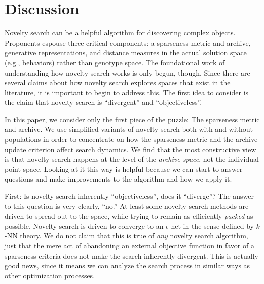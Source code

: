\documentclass[twoside]{article}
\begin{document}
\section{Discussion}
\label{sec:discussion}


Novelty search can be a helpful algorithm for discovering complex objects.  Proponents espouse three critical components:  a sparseness metric and archive, generative representations, and distance measures in the actual solution space (e.g., behaviors) rather than genotype space.  The foundational work of understanding how novelty search works is only begun, though.  Since there are several claims about how novelty search explores spaces that exist in the literature, it is important to begin to address this.  The first idea to consider is the claim that novelty search is ``divergent'' and ``objectiveless''.  

In this paper, we consider only the first piece of the puzzle:  The sparseness metric and archive.  We use simplified variants of novelty search both with and without populations in order to concentrate on how the sparseness metric and the archive update criterion affect search dynamics.  We find that the most constructive view is that novelty search happens at the level of the \emph{archive space}, not the individual point space.  Looking at it this way is helpful because we can start to answer questions and make improvements to the algorithm and how we apply it.

First:  Is novelty search inherently ``objectiveless'', does it ``diverge''?  The answer to this question is very clearly, ``no.''   At least some novelty search methods are driven to spread out to \emph{} the space, while trying to remain as efficiently \emph{packed} as possible.  Novelty search is driven to converge to an $\epsilon$-net in the sense defined by $k$-NN theory.  We do not claim that this is true of \emph{any} novelty search algorithm, just that the mere act of abandoning an external objective function in favor of a sparseness criteria does not make the search inherently divergent.  This is actually good news, since it means we can analyze the search process in similar ways as other optimization processes.  %
\end{document}
